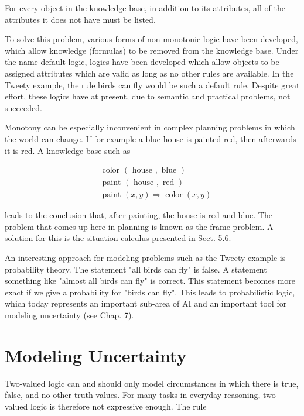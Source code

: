 \documentclass[10pt]{book}
\begin{document}
For every object in the knowledge base, in addition to its attributes, all of the attributes it does not have must be listed.

To solve this problem, various forms of non-monotonic logic have been developed, which allow knowledge (formulas) to be removed from the knowledge base. Under the name default logic, logics have been developed which allow objects to be assigned attributes which are valid as long as no other rules are available. In the Tweety example, the rule birds can fly would be such a default rule. Despite great effort, these logics have at present, due to semantic and practical problems, not succeeded.

Monotony can be especially inconvenient in complex planning problems in which the world can change. If for example a blue house is painted red, then afterwards it is red. A knowledge base such as

$$
\begin{aligned}
& \text { color }(\text { house }, \text { blue }) \\
& \text { paint }(\text { house }, \text { red }) \\
& \text { paint }(x, y) \Rightarrow \operatorname{color}(x, y)
\end{aligned}
$$

leads to the conclusion that, after painting, the house is red and blue. The problem that comes up here in planning is known as the frame problem. A solution for this is the situation calculus presented in Sect. 5.6.

An interesting approach for modeling problems such as the Tweety example is probability theory. The statement "all birds can fly" is false. A statement something like "almost all birds can fly" is correct. This statement becomes more exact if we give a probability for "birds can fly". This leads to probabilistic logic, which today represents an important sub-area of AI and an important tool for modeling uncertainty (see Chap. 7).

\section{Modeling Uncertainty}
Two-valued logic can and should only model circumstances in which there is true, false, and no other truth values. For many tasks in everyday reasoning, two-valued logic is therefore not expressive enough. The rule
\end{document}
